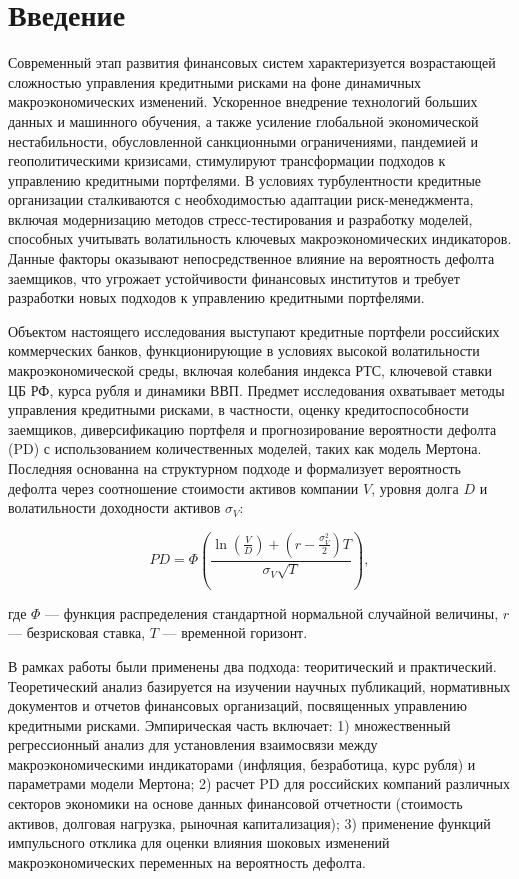 \documentclass[]{article}
\begin{document}
	
	
	
	\newpage
	\tableofcontents
	
	\newpage
	\section{Введение}
		
	
	Современный этап развития финансовых систем характеризуется возрастающей сложностью управления кредитными рисками на фоне динамичных макроэкономических изменений. Ускоренное внедрение технологий больших данных и машинного обучения, а также усиление глобальной экономической нестабильности, обусловленной санкционными ограничениями, пандемией и геополитическими кризисами, стимулируют трансформации подходов к управлению кредитными портфелями. В условиях турбулентности кредитные организации сталкиваются с необходимостью адаптации риск-менеджмента, включая модернизацию методов стресс-тестирования и разработку моделей, способных учитывать волатильность ключевых макроэкономических индикаторов. Данные факторы оказывают непосредственное влияние на вероятность дефолта заемщиков, что угрожает устойчивости финансовых институтов и требует разработки новых подходов к управлению кредитными портфелями.  
	
	Объектом настоящего исследования выступают кредитные портфели российских коммерческих банков, функционирующие в условиях высокой волатильности макроэкономической среды, включая колебания индекса РТС, ключевой ставки ЦБ РФ, курса рубля и динамики ВВП. Предмет исследования охватывает методы управления кредитными рисками, в частности, оценку кредитоспособности заемщиков, диверсификацию портфеля и прогнозирование вероятности дефолта (PD) с использованием количественных моделей, таких как модель Мертона. Последняя основанна на структурном подходе и формализует вероятность дефолта через соотношение стоимости активов компании \( V \), уровня долга \( D \) и волатильности доходности активов \( \sigma_V \):  
	
	\[
	PD = \Phi \left( \frac{\ln \left( \frac{V}{D} \right) + \left( r - \frac{\sigma_V^2}{2} \right) T}{\sigma_V \sqrt{T}} \right),  
	\]  
	
	где \( \Phi \) — функция распределения стандартной нормальной случайной величины, \( r \) — безрисковая ставка, \( T \) — временной горизонт.  
	
	В рамках работы были применены два подхода: теоритический и практический. Теоретический анализ базируется на изучении научных публикаций, нормативных документов и отчетов финансовых организаций, посвященных управлению кредитными рисками. Эмпирическая часть включает:  
	1) множественный регрессионный анализ для установления взаимосвязи между макроэкономическими индикаторами (инфляция, безработица, курс рубля) и параметрами модели Мертона;  
	2) расчет PD для российских компаний различных секторов экономики на основе данных финансовой отчетности (стоимость активов, долговая нагрузка, рыночная капитализация);  
	3) применение функций импульсного отклика для оценки влияния шоковых изменений макроэкономических переменных на вероятность дефолта.  
	
\end{document}
